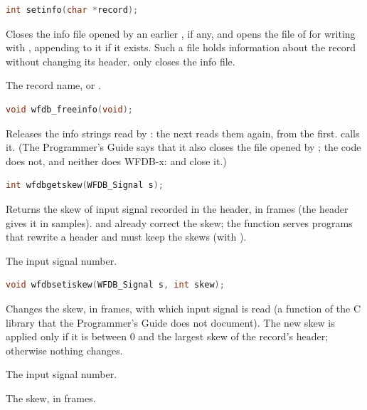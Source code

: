 \begin{lstlisting}[language=C,style=signature]
int setinfo(char *record);
\end{lstlisting}
Closes the info file opened by an earlier , if any, and opens
the  file of  for writing with ,
appending to it if it exists. Such a file holds information about the record
without changing its header.  only closes the info file.
\begin{params}
\item[record] The record name, or .
\end{params}

\begin{lstlisting}[language=C,style=signature]
void wfdb_freeinfo(void);
\end{lstlisting}
Releases the info strings read by : the next 
reads them again, from the first.  calls it. (The Programmer's
Guide says that it also closes the file opened by ; the code
does not, and neither does WFDB-x:  and 
close it.)

\begin{lstlisting}[language=C,style=signature]
int wfdbgetskew(WFDB_Signal s);
\end{lstlisting}
Returns the skew of input signal  recorded in the header, in frames
(the header gives it in samples).  and  already
correct the skew; the function serves programs that rewrite a header and
must keep the skews (with ).
\begin{params}
\item[s] The input signal number.
\end{params}

\begin{lstlisting}[language=C,style=signature]
void wfdbsetiskew(WFDB_Signal s, int skew);
\end{lstlisting}
Changes the skew, in frames, with which input signal  is read (a
function of the C library that the Programmer's Guide does not document). The
new skew is applied only if it is between 0 and the largest skew of the
record's header; otherwise nothing changes.
\begin{params}
\item[s] The input signal number.
\item[skew] The skew, in frames.
\end{params}

